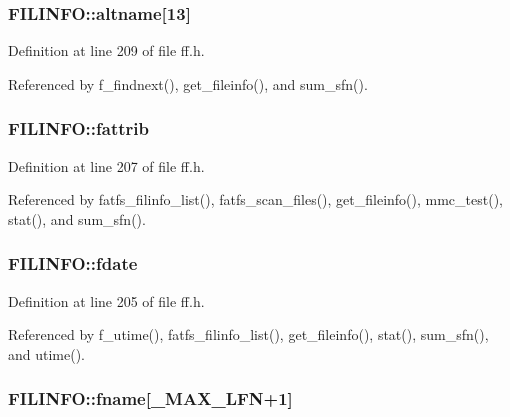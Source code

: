 \subsubsection[{\texorpdfstring{altname}{altname}}]{ F\+I\+L\+I\+N\+F\+O\+::altname\mbox{[}13\mbox{]}}\hypertarget{structFILINFO_a37243296fadacbde8500b5668d99682e}{}\label{structFILINFO_a37243296fadacbde8500b5668d99682e}


Definition at line 209 of file ff.\+h.



Referenced by f\+\_\+findnext(), get\+\_\+fileinfo(), and sum\+\_\+sfn().

\subsubsection[{\texorpdfstring{fattrib}{fattrib}}]{ F\+I\+L\+I\+N\+F\+O\+::fattrib}\hypertarget{structFILINFO_a838d542585831b085537b363f18205c0}{}\label{structFILINFO_a838d542585831b085537b363f18205c0}


Definition at line 207 of file ff.\+h.



Referenced by fatfs\+\_\+filinfo\+\_\+list(), fatfs\+\_\+scan\+\_\+files(), get\+\_\+fileinfo(), mmc\+\_\+test(), stat(), and sum\+\_\+sfn().

\subsubsection[{\texorpdfstring{fdate}{fdate}}]{ F\+I\+L\+I\+N\+F\+O\+::fdate}\hypertarget{structFILINFO_a7c01c48a15b1b49da459924437b0bd52}{}\label{structFILINFO_a7c01c48a15b1b49da459924437b0bd52}


Definition at line 205 of file ff.\+h.



Referenced by f\+\_\+utime(), fatfs\+\_\+filinfo\+\_\+list(), get\+\_\+fileinfo(), stat(), sum\+\_\+sfn(), and utime().

\subsubsection[{\texorpdfstring{fname}{fname}}]{ F\+I\+L\+I\+N\+F\+O\+::fname\mbox{[}{\bf \+\_\+\+M\+A\+X\+\_\+\+L\+FN}+1\mbox{]}}\hypertarget{structFILINFO_a7c3ce2dd03dc9a9726967fc43116079f}{}\label{structFILINFO_a7c3ce2dd03dc9a9726967fc43116079f}


